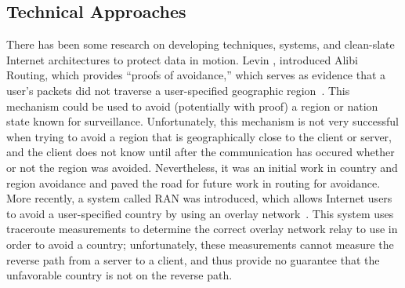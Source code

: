 \subsection{Technical Approaches}
\label{sec:tech_motion}


There has been some research on developing techniques, systems, and clean-slate Internet architectures to protect data in motion.  Levin \ea, introduced Alibi Routing, which provides ``proofs of avoidance,'' which serves as evidence that a user's packets did not traverse a user-specified geographic region~\cite{levin2015alibi}.  This mechanism could be used to avoid (potentially with proof) a region or nation state known for surveillance.  Unfortunately, this mechanism is not very successful when trying to avoid a region that is geographically close to the client or server, and the client does not know until after the communication has occured whether or not the region was avoided.  Nevertheless, it was an initial work in country and region avoidance and paved the road for future work in routing for avoidance.  More recently, a system called RAN was introduced, which allows Internet users to avoid a user-specified country by using an overlay network~\cite{edmundson2017ran}.  This system uses traceroute measurements to determine the correct overlay network relay to use in order to avoid a country; unfortunately, these measurements cannot measure the reverse path from a server to a client, and thus provide no guarantee that the unfavorable country is not on the reverse path.


